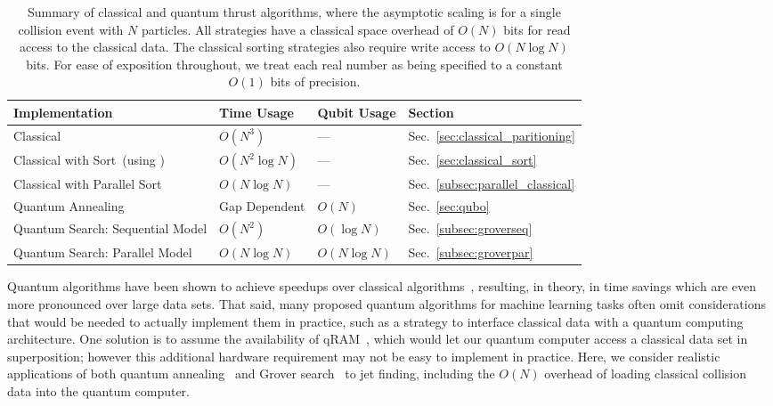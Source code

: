 \documentclass[aps,prd,twocolumn,superscriptaddress,preprintnumbers,nofootinbib,longbibliography,floatfix]{revtex4-1}
\DeclareRobustCommand{\Sec}[1]{Sec.~\ref{#1}}
\begin{document}
\begin{table*}[t]
\begin{tabular}{l @{$\quad$} l @{$\quad$} l @{$\quad$} l }
\hline
\hline
\textbf{Implementation} & \textbf{Time Usage} & \textbf{Qubit Usage} & \textbf{Section}\\
\hline
\hline
Classical~\cite{Yamamoto:1984fd} & $O(N^3)$ & --- & \Sec{sec:classical_paritioning}\\
Classical with Sort~(using \cite{Salam:2007xv}) & $O(N^2 \log N)$ & --- & \Sec{sec:classical_sort}\\
Classical with Parallel Sort & $O(N \log N)$ & --- & \Sec{subsec:parallel_classical}\\
\hline
Quantum Annealing & Gap Dependent & $O(N)$ & \Sec{sec:qubo}\\
Quantum Search: Sequential Model & $O(N^2)$ & $O(\log N)$  & \Sec{subsec:groverseq}\\
Quantum Search: Parallel Model & $O(N \log N)$ & $O(N\log N)$ & \Sec{subsec:groverpar}\\
\hline
\hline
\end{tabular}
\label{tab:summary}
\caption{Summary of classical and quantum thrust algorithms, where the asymptotic scaling is for a single collision event with $N$ particles.
%
All strategies have a classical space overhead of $O(N)$ bits for read access to the classical data.
%
The classical sorting strategies also require write access to $O(N \log N)$ bits.
%
For ease of exposition throughout, we treat each real number as being specified to a constant $O(1)$ bits of precision.
}
\end{table*}




Quantum algorithms have been shown to achieve speedups over classical algorithms~\cite{Nielsen:2011:QCQ:1972505}, resulting, in theory, in time savings which are even more pronounced over large data sets.
%
That said, many proposed quantum algorithms for machine learning tasks often omit considerations that would be needed to actually implement them in practice, such as a strategy to interface classical data with a quantum computing architecture.
%
One solution is to assume the availability of qRAM~\cite{PhysRevLett.100.160501}, which would let our quantum computer access a classical data set in superposition; however this additional hardware requirement may not be easy to implement in practice.
%
Here, we consider realistic applications of both quantum annealing~\cite{PhysRevE.58.5355, 2000quant.ph..1106F, dwave} and Grover search~\cite{Grover:1996:FQM:237814.237866, Boyer:1996zf, Durr:1996nx} to jet finding, including the $O(N)$ overhead of loading classical collision data into the quantum computer.
\end{document}
